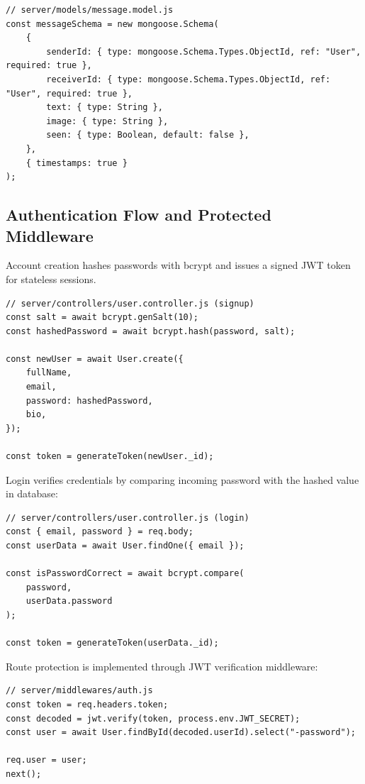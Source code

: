 \documentclass[12pt,a4paper]{report}
\begin{document}
\begin{verbatim}
// server/models/message.model.js
const messageSchema = new mongoose.Schema(
    {
        senderId: { type: mongoose.Schema.Types.ObjectId, ref: "User", required: true },
        receiverId: { type: mongoose.Schema.Types.ObjectId, ref: "User", required: true },
        text: { type: String },
        image: { type: String },
        seen: { type: Boolean, default: false },
    },
    { timestamps: true }
);
\end{verbatim}

\subsection{Authentication Flow and Protected Middleware}
Account creation hashes passwords with bcrypt and issues a signed JWT token for stateless sessions.

\begin{verbatim}
// server/controllers/user.controller.js (signup)
const salt = await bcrypt.genSalt(10);
const hashedPassword = await bcrypt.hash(password, salt);

const newUser = await User.create({
    fullName,
    email,
    password: hashedPassword,
    bio,
});

const token = generateToken(newUser._id);
\end{verbatim}

Login verifies credentials by comparing incoming password with the hashed value in database:

\begin{verbatim}
// server/controllers/user.controller.js (login)
const { email, password } = req.body;
const userData = await User.findOne({ email });

const isPasswordCorrect = await bcrypt.compare(
    password,
    userData.password
);

const token = generateToken(userData._id);
\end{verbatim}

Route protection is implemented through JWT verification middleware:

\begin{verbatim}
// server/middlewares/auth.js
const token = req.headers.token;
const decoded = jwt.verify(token, process.env.JWT_SECRET);
const user = await User.findById(decoded.userId).select("-password");

req.user = user;
next();
\end{verbatim}
\end{document}
